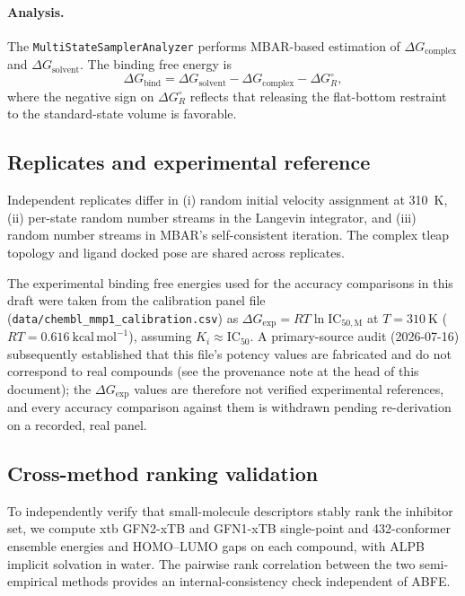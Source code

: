 \documentclass[11pt,a4paper]{article}
\newcommand{\dG}{\Delta G}
\newcommand{\dGbind}{\dG_{\mathrm{bind}}}
\newcommand{\dGcomplex}{\dG_{\mathrm{complex}}}
\newcommand{\dGsolvent}{\dG_{\mathrm{solvent}}}
\newcommand{\dGexp}{\dG_{\mathrm{exp}}}
\newcommand{\kcalmol}{\mathrm{kcal\,mol^{-1}}}
\begin{document}
\paragraph{Analysis.} The \texttt{MultiStateSamplerAnalyzer} performs
MBAR-based estimation of $\dGcomplex$ and $\dGsolvent$. The binding
free energy is
\begin{equation}
  \dGbind = \dGsolvent - \dGcomplex - \dG_R^\circ,
\end{equation}
where the negative sign on $\dG_R^\circ$ reflects that releasing the
flat-bottom restraint to the standard-state volume is favorable.

\subsection{Replicates and experimental reference}

Independent replicates differ in (i) random initial velocity
assignment at \SI{310}{\kelvin}, (ii) per-state random number streams
in the Langevin integrator, and (iii) random number streams in MBAR's
self-consistent iteration. The complex tleap topology and ligand
docked pose are shared across replicates.

The experimental binding free energies used for the accuracy comparisons in
this draft were taken from the calibration panel file
(\texttt{data/chembl\_mmp1\_calibration.csv}) as
$\dGexp = RT \ln \mathrm{IC}_{50,\text{M}}$ at $T = \SI{310}{\kelvin}$
($RT = \SI{0.616}{\kcalmol}$), assuming $K_i \approx \mathrm{IC}_{50}$. A
primary-source audit (2026-07-16) subsequently established that this file's
potency values are fabricated and do not correspond to real compounds (see the
provenance note at the head of this document); the $\dGexp$ values are therefore
not verified experimental references, and every accuracy comparison against them
is withdrawn pending re-derivation on a recorded, real panel.

\subsection{Cross-method ranking validation}

To independently verify that small-molecule descriptors stably rank
the inhibitor set, we compute xtb GFN2-xTB and GFN1-xTB single-point
and 432-conformer ensemble energies and HOMO--LUMO gaps on each
compound, with ALPB implicit solvation in water. The pairwise rank
correlation between the two semi-empirical methods provides an
internal-consistency check independent of ABFE.
\end{document}
